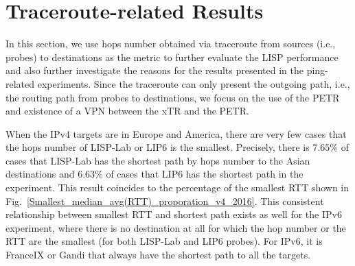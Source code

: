 \section{Traceroute-related Results}
\label{sec:pxtr_traceroute} 
In this section, we use hops number obtained via traceroute from sources (i.e., probes) to destinations as the metric to further evaluate the LISP performance and also further investigate the reasons for the results presented in the ping-related experiments. Since the traceroute can only present the outgoing path, i.e., the routing path from probes to destinations, we focus on the use of the PETR and existence of a VPN between the xTR and the PETR.

When the IPv4 targets are in Europe and America, there are very few cases that the hops number of LISP-Lab or LIP6 is the smallest. Precisely, there is $7.65\%$ of cases that LISP-Lab has the shortest path by hops number to the Asian destinations and $6.63\%$ of cases that LIP6 has the shortest path in the experiment. This result coincides to the percentage of the smallest RTT shown in Fig.~\ref{Smallest_median_avg(RTT)_proporation_v4_2016}.
This consistent relationship between smallest RTT and shortest path exists as well for the IPv6 experiment, where there is no destination at all for which the hop number or the RTT are the smallest (for both LISP-Lab and LIP6 probes). For IPv6, it is FranceIX or Gandi that always have the shortest path to all the targets.

